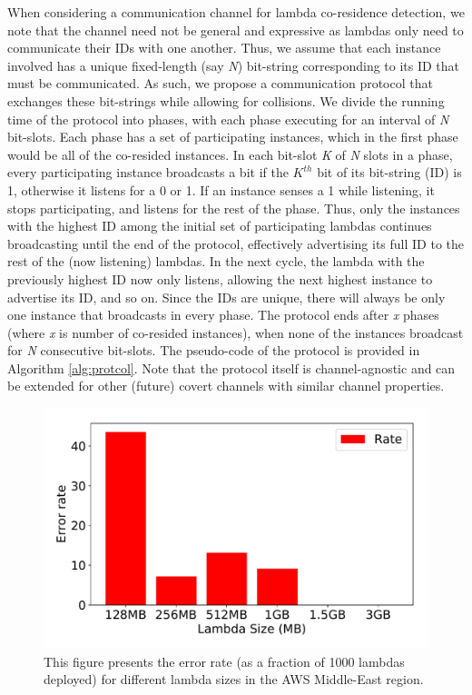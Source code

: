 When considering a communication channel for lambda co-residence detection, we
note that the channel need not be general and expressive as lambdas only need to
communicate their IDs with one another. Thus, we assume that each instance
involved has a unique fixed-length (say \emph{N}) bit-string corresponding to
its ID that must be communicated.  As such, we propose a communication protocol
that exchanges these bit-strings while allowing for collisions. We divide the
running time of the protocol into phases, with each phase executing for an
interval of \textit{N} bit-slots. Each phase has a set of participating
instances, which in the first phase would be all of the co-resided instances. In
each bit-slot \textit{K} of \textit{N} slots in a phase, every participating
instance broadcasts a bit if the $K^{th}$ bit of its bit-string (ID) is 1,
otherwise it listens for a 0 or 1. If an instance senses a 1 while listening, it
stops participating, and listens for the rest of the phase. Thus, only the
instances with the highest ID among the initial set of participating lambdas
continues broadcasting until the end of the protocol, effectively advertising
its full ID to the rest of the (now listening) lambdas. In the next cycle, the
lambda with the previously highest ID now only listens, allowing the next
highest instance to advertise its ID, and so on.  Since the IDs are unique,
there will always be only one instance that broadcasts in every phase. The
protocol ends after \textit{x} phases (where \textit{x} is number of co-resided
instances), when none of the instances broadcast for \textit{N} consecutive
bit-slots. The pseudo-code of the protocol is provided in Algorithm
\ref{alg:protcol}. Note that the protocol itself is channel-agnostic and can be
extended for other (future) covert channels with similar channel properties.

\begin{figure}[!t]
  \includegraphics[width=.99\linewidth]{fig/errorrates.pdf}
  \caption{This figure presents the error rate (as a fraction of 1000 lambdas
  deployed) for different lambda sizes in the AWS Middle-East region. 
\label{fig:errorrates}}
\end{figure}

